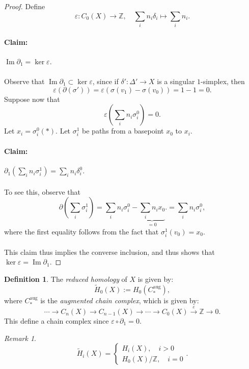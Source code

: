\documentclass[a4paper]{report}
\theoremstyle{definition}
\newtheorem{definition}{Definition}
\theoremstyle{remark}
\newtheorem{remark}{Remark}
\theoremstyle{proposition}
\theoremstyle{conjecture}
\theoremstyle{lemma}
\theoremstyle{corollary}
\theoremstyle{exercise}
\newcommand{\on}{\operatorname}
\begin{document}
\begin{proof}
    Define $$\varepsilon : C_0(X) \longrightarrow \mathbb{Z}, \quad \sum_i n_i \delta_i \longmapsto \sum_i n_i.$$
    \paragraph{Claim:} $\on{Im}\partial_1 = \ker \varepsilon$.\\\\
    Observe that $\on{Im}\partial_1 \subset \ker \varepsilon$, since  if $\delta' : \Delta' \to X$
    is a singular $1$-simplex, then 
    $$\varepsilon(\partial(\sigma')) = \varepsilon (\sigma(v_1) - \sigma(v_0)) = 1 - 1 = 0.$$
    Suppose now that $$\varepsilon\left(\sum_i n_i \sigma^0_i\right) = 0.$$
    Let $x_i = \sigma^0_i(\ast)$. Let $\sigma^1_i$ be paths from a basepoint $x_0$ to 
    $x_i$. 
    \paragraph{Claim:} $\partial_1\left(\sum_i n_i\sigma^1_i\right) = \sum_i n_i \delta_i^0$.\\\\
    To see this, observe that 
    $$\partial\left(\sum_i \sigma_i^1\right) = \sum_i n_i \sigma_i^0 - \underbrace{\sum_i n_i x_0}_{=0}. = \sum_i n_i \sigma_i^0,$$
    where the first equality follows from the fact that $\sigma_i^1(v_0) = x_0$.\\\\
    This claim thus implies the converse inclusion, and thus shows that 
    $\ker \varepsilon = \on{Im}\partial_1$.
\end{proof}

\begin{definition}
    The \emph{reduced homology} of $X$ is given by:
    $$\widetilde{H}_0(X) := H_0(C^{\on{aug}}_\ast),$$
    where $C^{\on{aug}}_\ast$ is the \emph{augmented chain complex}, which is given by:
    $$\cdots \longrightarrow C_n(X) \longrightarrow C_{n-1}(X) \longrightarrow \cdots \longrightarrow C_0(X) \stackrel{\varepsilon}{\longrightarrow} \mathbb{Z} \longrightarrow 0.$$
    This define a chain complex since 
    $\varepsilon \circ \partial_1 = 0$.
\end{definition}

\begin{remark}
    $$\widetilde{H}_i(X) = \begin{cases}
        H_i(X), \quad i > 0\\ 
        H_0(X) / \mathbb{Z},\quad i = 0
    \end{cases}.$$
\end{remark}
\end{document}
